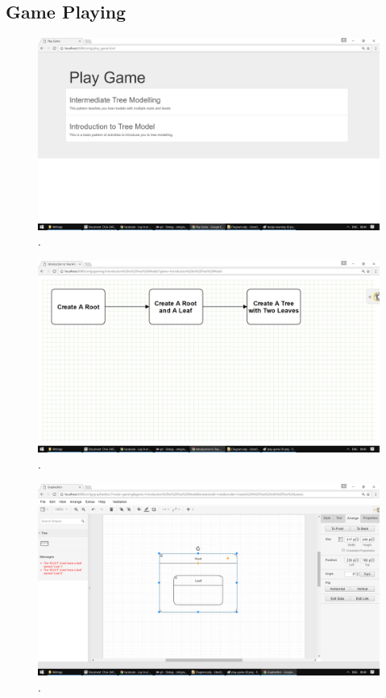 \documentclass[12pt, a4paper]{report} \usepackage[titletoc]{appendix}
\begin{document}
\begin{appendices}
\subsection{Game Playing}

\begin{figure}[ht] \centering \includegraphics[width=12cm]{play-game-01}
\caption{.}
\label{play-game-01}
\end{figure}

\begin{figure}[ht] \centering \includegraphics[width=12cm]{play-game-02}
\caption{.}
\label{play-game-02}
\end{figure}

\begin{figure}[ht] \centering \includegraphics[width=12cm]{play-game-03}
\caption{.}
\label{play-game-03}
\end{figure}


\end{appendices}
\end{document}
